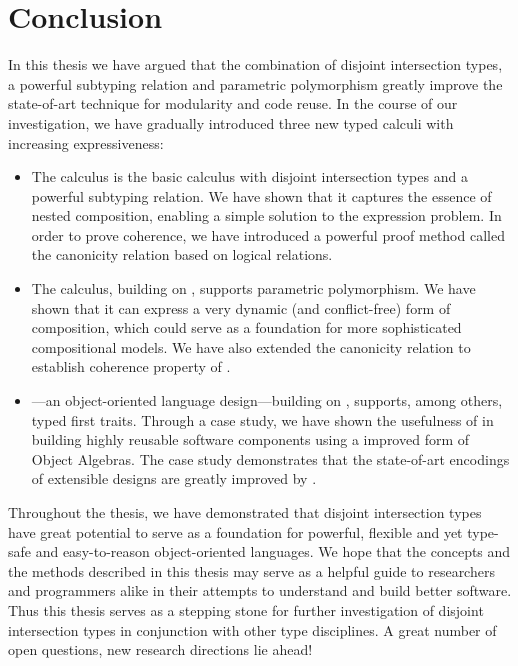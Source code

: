 \chapter{Conclusion}
\label{chap:conclusion}


In this thesis we have argued that the combination of disjoint intersection
types, a powerful subtyping relation and parametric polymorphism greatly improve
the state-of-art technique for modularity and code reuse. In the course of our
investigation, we have gradually introduced three new typed calculi with
increasing expressiveness:
\begin{itemize}
\item The \namee calculus is the basic calculus with disjoint intersection types
  and a powerful subtyping relation. We have shown that it captures the essence
  of nested composition, enabling a simple solution to the expression problem.
  In order to prove coherence, we have introduced a powerful proof method called
  the canonicity relation based on logical relations.
\item The \fnamee calculus, building on \namee, supports parametric
  polymorphism. We have shown that it can express a very dynamic (and
  conflict-free) form of composition, which could serve as a foundation for more
  sophisticated compositional models. We have also extended the canonicity
  relation to establish coherence property of \fnamee.
\item \sedel---an object-oriented language design---building on \fnamee,
  supports, among others, typed first traits. Through a case study, we have
  shown the usefulness of \fnamee in building highly reusable software
  components using a improved form of Object Algebras. The case study
  demonstrates that the state-of-art encodings of extensible designs are greatly
  improved by \fnamee.
\end{itemize}

Throughout the thesis, we have demonstrated that disjoint intersection types have great
potential to serve as a foundation for powerful, flexible and yet type-safe and
easy-to-reason object-oriented languages. We hope that the concepts and the
methods described in this thesis may serve as a helpful guide to researchers and
programmers alike in their attempts to understand and build better software.
Thus this thesis serves as a stepping stone for further investigation of
disjoint intersection types in conjunction with other type disciplines. A great
number of open questions, new research directions lie ahead!




